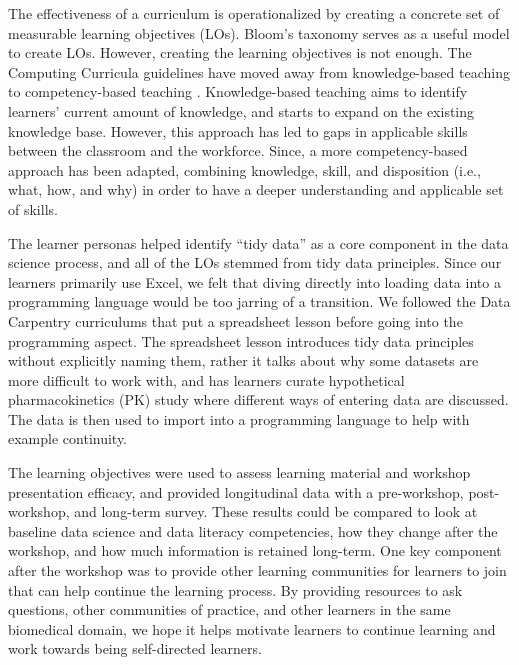 \documentclass[030-workshop.tex]{subfiles}
\begin{document}
    The effectiveness of a curriculum is operationalized by creating a concrete set of
    measurable learning objectives (LOs).
    Bloom's taxonomy serves as a useful model to create LOs.
    However, creating the learning objectives is not enough.
    The Computing Curricula guidelines have moved away from knowledge-based teaching to competency-based teaching
    \cite{cc2005, cc2020, ccdsc2021}.
    Knowledge-based teaching aims to identify learners' current amount of knowledge,
    and starts to expand on the existing knowledge base.
    However, this approach has led to gaps in applicable skills between the classroom and the workforce.
    Since, a more competency-based approach has been adapted,
    combining knowledge, skill, and disposition (i.e., what, how, and why) in order
    to have a deeper understanding and applicable set of skills.

    The learner personas helped identify ``tidy data'' as a core component in the data science process,
    and all of the LOs stemmed from tidy data principles.
    Since our learners primarily use Excel,
    we felt that diving directly into loading data into a programming language would be too jarring of a transition.
    We followed the Data Carpentry curriculums that put a spreadsheet lesson before going into the programming aspect.
    The spreadsheet lesson introduces tidy data principles without explicitly naming them,
    rather it talks about why some datasets are more difficult to work with,
    and has learners curate hypothetical pharmacokinetics (PK) study where different ways of entering data are discussed.
    The data is then used to import into a programming language to help with example continuity.

    The learning objectives were used to assess learning material and workshop presentation efficacy,
    and provided longitudinal data with a pre-workshop, post-workshop, and long-term survey.
    These results could be compared to look at baseline data science and data literacy competencies,
    how they change after the workshop,
    and how much information is retained long-term.
    One key component after the workshop was to provide other learning communities for learners to join
    that can help continue the learning process.
    By providing resources to ask questions, other communities of practice,
    and other learners in the same biomedical domain,
    we hope it helps motivate learners to continue learning and work towards being self-directed learners.
\end{document}
